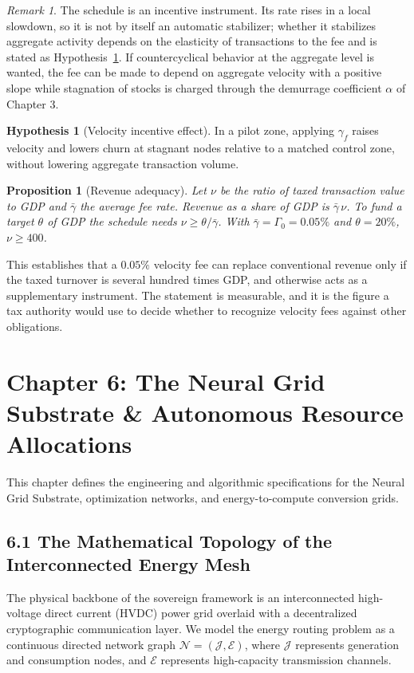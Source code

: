 \documentclass[11pt,a4paper]{article}
\theoremstyle{definition}
\newtheorem{hypothesis}{Hypothesis}
\theoremstyle{plain}
\newtheorem{proposition}{Proposition}
\theoremstyle{remark}
\newtheorem*{remark}{Remark}
\begin{document}
\begin{remark}
The schedule is an incentive instrument. Its rate rises in a local slowdown, so it is not by itself an automatic stabilizer; whether it stabilizes aggregate activity depends on the elasticity of transactions to the fee and is stated as Hypothesis~\ref{hyp:fee}. If countercyclical behavior at the aggregate level is wanted, the fee can be made to depend on aggregate velocity with a positive slope while stagnation of stocks is charged through the demurrage coefficient $\alpha$ of Chapter 3.
\end{remark}

\begin{hypothesis}[Velocity incentive effect]\label{hyp:fee}
In a pilot zone, applying $\gamma_f$ raises velocity and lowers churn at stagnant nodes relative to a matched control zone, without lowering aggregate transaction volume.
\end{hypothesis}

\begin{proposition}[Revenue adequacy]\label{prop:revenue}
Let $\nu$ be the ratio of taxed transaction value to GDP and $\bar\gamma$ the average fee rate. Revenue as a share of GDP is $\bar\gamma\,\nu$. To fund a target $\theta$ of GDP the schedule needs $\nu \ge \theta / \bar\gamma$. With $\bar\gamma = \Gamma_0 = 0.05\%$ and $\theta = 20\%$, $\nu \ge 400$.
\end{proposition}

This establishes that a $0.05\%$ velocity fee can replace conventional revenue only if the taxed turnover is several hundred times GDP, and otherwise acts as a supplementary instrument. The statement is measurable, and it is the figure a tax authority would use to decide whether to recognize velocity fees against other obligations.

\clearpage
\clearpage
\section*{Chapter 6: The Neural Grid Substrate \& Autonomous Resource Allocations}
This chapter defines the engineering and algorithmic specifications for the Neural Grid Substrate, optimization networks, and energy-to-compute conversion grids.

\subsection*{6.1 The Mathematical Topology of the Interconnected Energy Mesh}
The physical backbone of the sovereign framework is an interconnected high-voltage direct current (HVDC) power grid overlaid with a decentralized cryptographic communication layer. We model the energy routing problem as a continuous directed network graph $\mathcal N = (\mathcal J, \mathcal E)$, where $\mathcal J$ represents generation and consumption nodes, and $\mathcal E$ represents high-capacity transmission channels.
\end{document}
